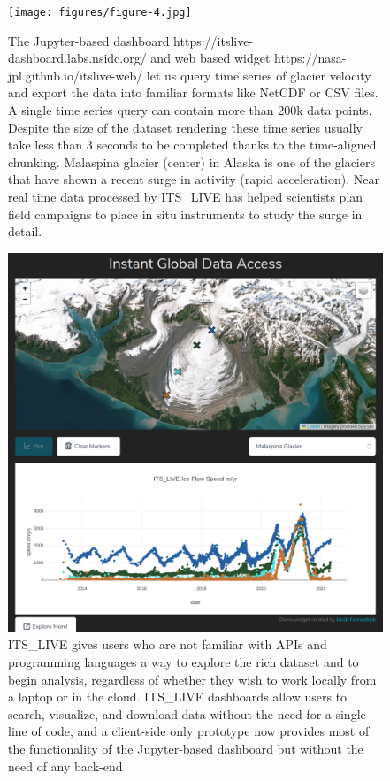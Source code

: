 \documentclass[
  super,
  preprint,
  3p,
  twocolumn]{elsarticle}
\begin{document}
\begin{figure}

{\centering 

\texttt{[image: figures/figure-4.jpg]}

}

\caption{\label{fig-2}The Jupyter-based dashboard
https://itslive-dashboard.labs.nsidc.org/ and web based widget
https://nasa-jpl.github.io/itslive-web/ let us query time series of
glacier velocity and export the data into familiar formats like NetCDF
or CSV files. A single time series query can contain more than 200k data
points. Despite the size of the dataset rendering these time series
usually take less than 3 seconds to be completed thanks to the
time-aligned chunking. Malaspina glacier (center) in Alaska is one of
the glaciers that have shown a recent surge in activity (rapid
acceleration). Near real time data processed by ITS\_LIVE has helped
scientists plan field campaigns to place in situ instruments to study
the surge in detail.}

\end{figure}

\begin{figure}

{\centering 

\includegraphics{figures/figure-5.png}

}

\caption{\label{fig-3}ITS\_LIVE gives users who are not familiar with
APIs and programming languages a way to explore the rich dataset and to
begin analysis, regardless of whether they wish to work locally from a
laptop or in the cloud. ITS\_LIVE dashboards allow users to search,
visualize, and download data without the need for a single line of code,
and a client-side only prototype now provides most of the functionality
of the Jupyter-based dashboard but without the need of any back-end
\citep[server][]{Fahnestock2023-fu}}

\end{figure}
\end{document}
